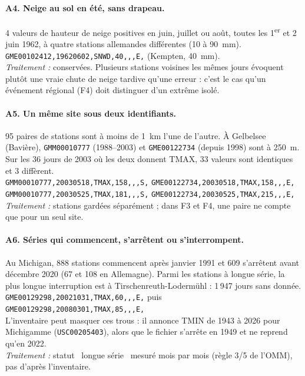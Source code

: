 \paragraph{A4. Neige au sol en été, sans drapeau.}
4 valeurs de hauteur de neige positives en juin, juillet ou août, toutes les 1\textsuperscript{er} et 2 juin 1962, à quatre stations allemandes différentes (10 à 90~mm). \\
\texttt{GME00102412,19620602,SNWD,40,,,E,} (Kempten, 40~mm). \\
\emph{Traitement :} conservées. Plusieurs stations voisines les mêmes jours évoquent plutôt une vraie chute de neige tardive qu'une erreur : c'est le cas qu'un événement régional (F4) doit distinguer d'un extrême isolé.

\paragraph{A5. Un même site sous deux identifiants.}
95 paires de stations sont à moins de 1~km l'une de l'autre. À Gelbelsee (Bavière), \texttt{GMM00010777} (1988--2003) et \texttt{GME00122734} (depuis 1998) sont à 250~m. Sur les 36 jours de 2003 où les deux donnent TMAX, 33 valeurs sont identiques et 3 diffèrent. \\
\texttt{GMM00010777,20030518,TMAX,158,,,S,} \quad \texttt{GME00122734,20030518,TMAX,158,,,E,} \\
\texttt{GMM00010777,20030525,TMAX,181,,,S,} \quad \texttt{GME00122734,20030525,TMAX,215,,,E,} \\
\emph{Traitement :} stations gardées séparément ; dans F3 et F4, une paire ne compte que pour un seul site.

\paragraph{A6. Séries qui commencent, s'arrêtent ou s'interrompent.}
Au Michigan, 888 stations commencent après janvier 1991 et 609 s'arrêtent avant décembre 2020 (67 et 108 en Allemagne). Parmi les stations à longue série, la plus longue interruption est à Tirschenreuth-Lodermühl : 1\,947 jours sans donnée. \\
\texttt{GME00129298,20021031,TMAX,60,,,E,} puis \texttt{GME00129298,20080301,TMAX,85,,,E,} \\
L'inventaire peut masquer ces trous : il annonce TMIN de 1943 à 2026 pour Michigamme (\texttt{USC00205403}), alors que le fichier s'arrête en 1949 et ne reprend qu'en 2022. \\
\emph{Traitement :} statut \guillemotleft~longue série~\guillemotright{} mesuré mois par mois (règle 3/5 de l'OMM), pas d'après l'inventaire.
